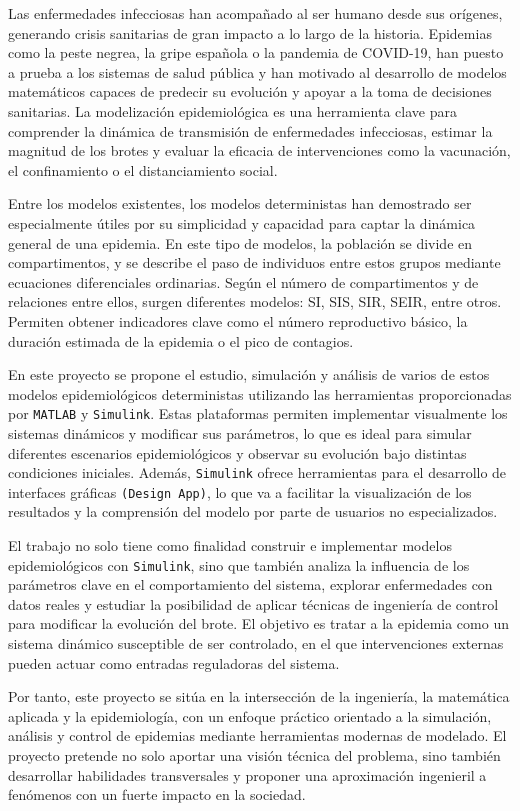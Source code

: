 Las enfermedades infecciosas han acompañado al ser humano desde sus orígenes, generando crisis sanitarias de gran impacto a lo largo de la historia. Epidemias como la peste negrea, la gripe española o la pandemia de COVID-19, han puesto a prueba a los sistemas de salud pública y han motivado al desarrollo de modelos matemáticos capaces de predecir su evolución y apoyar a la toma de decisiones sanitarias. La modelización epidemiológica es una herramienta clave para comprender la dinámica de transmisión de enfermedades infecciosas, estimar la magnitud de los brotes y evaluar la eficacia de intervenciones como la vacunación, el confinamiento o el distanciamiento social.


Entre los modelos existentes, los modelos deterministas han demostrado ser especialmente útiles por su simplicidad y capacidad para captar la dinámica general de una epidemia. En este tipo de modelos, la población se divide en compartimentos, y se describe el paso de individuos entre estos grupos mediante ecuaciones diferenciales ordinarias. Según el número de compartimentos y de relaciones entre ellos, surgen diferentes modelos: SI, SIS, SIR, SEIR, entre otros. Permiten obtener indicadores clave como el número reproductivo básico, la duración estimada de la epidemia o el pico de contagios.


En este proyecto se propone el estudio, simulación y análisis de varios de estos modelos epidemiológicos deterministas utilizando las herramientas proporcionadas por \texttt{MATLAB} y \texttt{Simulink}. Estas plataformas permiten implementar visualmente los sistemas dinámicos y modificar sus parámetros, lo que es ideal para simular diferentes escenarios epidemiológicos y observar su evolución bajo distintas condiciones iniciales. Además, \texttt{Simulink} ofrece herramientas para el desarrollo de interfaces gráficas \texttt{(Design App)}, lo que va a facilitar la visualización de los resultados y la comprensión del modelo por parte de usuarios no especializados.


El trabajo no solo tiene como finalidad construir e implementar modelos epidemiológicos con \texttt{Simulink}, sino que también analiza la influencia de los parámetros clave en el comportamiento del sistema, explorar enfermedades con datos reales y estudiar la posibilidad de aplicar técnicas de ingeniería de control para modificar la evolución del brote. El objetivo es tratar a la epidemia como un sistema dinámico susceptible de ser controlado, en el que intervenciones externas pueden actuar como entradas reguladoras del sistema.


Por tanto, este proyecto se sitúa en la intersección de la ingeniería, la matemática aplicada y la epidemiología, con un enfoque práctico orientado a la simulación, análisis y control de epidemias mediante herramientas modernas de modelado. El proyecto pretende no solo aportar una visión técnica del problema, sino también desarrollar habilidades transversales y proponer una aproximación ingenieril a fenómenos con un fuerte impacto en la sociedad.
